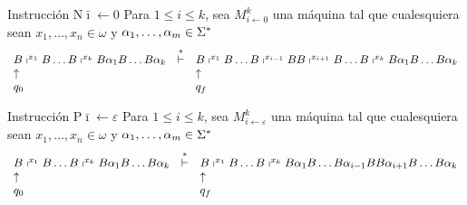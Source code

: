 \begin{frame}
  \begin{block}{Instrucción $\mathrm{N}\bar{\imath} \leftarrow 0$}
    \PN Para $1 \leq i \leq k$, sea $M_{i \leftarrow 0}^{k}$ una máquina tal que cualesquiera sean $x_{1}, \dotsc, x_{n}
    \in \omega$ y $\alpha_{1}, \dotsc,\alpha_{m} \in \Sigma^{\ast}$
    \minLetter
    \[
      \begin{array}{lcl}
        B \shortmid^{x_{1}} B \dotsc B \shortmid^{x_{k}} B \alpha_{1} B \dotsc B \alpha_{k} &\overset{\ast}{\vdash}& B
          \shortmid^{x_{1}} B \dotsc B \shortmid^{x_{i-1}} B B \shortmid^{x_{i+1}} B \dotsc B \shortmid^{x_{k}} B
          \alpha_{1} B \dotsc B \alpha_{k} \\
        \uparrow && \uparrow \\
        q_{0} & & q_{f}
      \end{array}
    \]
  \end{block}

  \begin{block}{Instrucción $\mathrm{P}\bar{\imath} \leftarrow \varepsilon$}
    \PN Para $1 \leq i \leq k$, sea $M_{i \leftarrow \varepsilon}^{k}$ una máquina tal que cualesquiera sean $x_{1},
    \dotsc, x_{n} \in \omega$ y $\alpha_{1}, \dotsc,\alpha_{m} \in \Sigma^{\ast}$
    \minLetter
    \[
      \begin{array}{lcl}
        B \shortmid^{x_{1}} B \dotsc B \shortmid^{x_{k}} B \alpha_{1} B \dotsc B \alpha_{k} &\overset{\ast}{\vdash}& B
          \shortmid^{x_{1}} B \dotsc B \shortmid^{x_{k}} B \alpha_{1} B \dotsc B \alpha_{i-1} B B \alpha_{i+1} B \dotsc
          B \alpha_{k} \\
        \uparrow && \uparrow \\
        q_{0} & & q_{f}
      \end{array}
    \]
  \end{block}
\end{frame}
